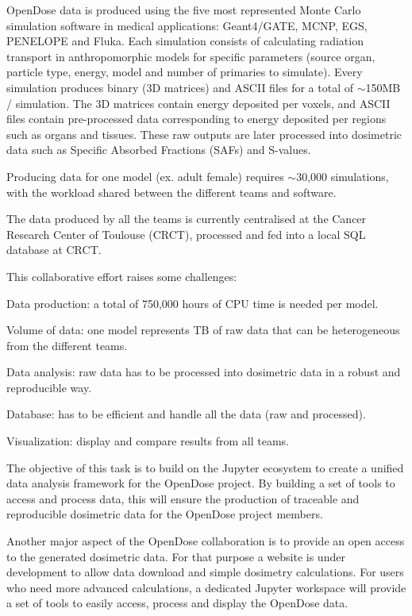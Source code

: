 \begin{task}[
  title=Nuclear Medicine application,
  id=opendose-analysis,
  lead=INSERM,
  PM=24,
  wphases={3-33},
  partners={XFEL}
]
  OpenDose data is produced using the five most represented Monte Carlo
  simulation software in medical applications: Geant4/GATE, MCNP, EGS, PENELOPE
  and Fluka. Each simulation consists of calculating radiation transport in
  anthropomorphic models for specific parameters (source organ, particle type,
  energy, model and number of primaries to simulate). Every simulation produces
  binary (3D matrices) and ASCII files for a total of $\sim$150MB / simulation.
  The 3D matrices contain energy deposited per voxels, and ASCII files contain
  pre-processed data corresponding to energy deposited per regions such as
  organs and tissues. These raw outputs are later processed into dosimetric
  data such as Specific Absorbed Fractions (SAFs) and S-values.

  Producing data for one model (ex. adult female) requires $\sim$30,000
  simulations, with the workload shared between the different teams and
  software.

  The data produced by all the teams is currently centralised at the Cancer
  Research Center of Toulouse (CRCT), processed and fed into a local SQL
  database at CRCT.

  This collaborative effort raises some challenges:
  \begin{compactitem}
  \item Data production: a total of 750,000 hours of CPU time is needed per
    model.
  \item Volume of data: one model represents TB of raw data that can be
    heterogeneous from the different teams.
  \item Data analysis: raw data has to be processed into dosimetric data in a
    robust and reproducible way.
  \item Database: has to be efficient and handle all the data (raw and
    processed).
  \item Visualization: display and compare results from all teams.
  \end{compactitem}

  The objective of this task is to build on the Jupyter ecosystem to create a
  unified data analysis framework for the OpenDose project. By building a set
  of tools to access and process data, this will ensure the production of
  traceable and reproducible dosimetric data for the OpenDose project members.

  Another major aspect of the OpenDose collaboration is to provide an open
  access to the generated dosimetric data. For that purpose a website is under
  development to allow data download and simple dosimetry calculations. For
  users who need more advanced calculations, a dedicated Jupyter workspace will
  provide a set of tools to easily access, process and display the OpenDose
  data.


\end{task}
